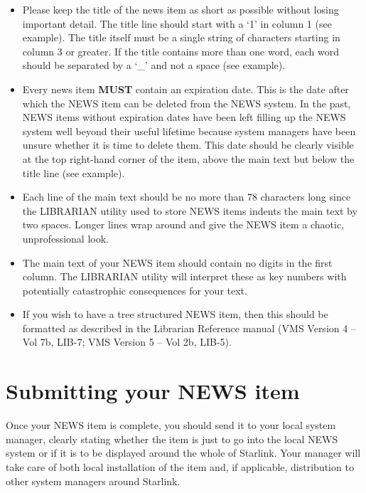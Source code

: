\begin{itemize}

\item Please keep the title of the news item as short as possible 
without losing important detail. The title line should start with a 
`1' in column 1 (see example). The title itself must be a single string of
characters starting in column 3 or greater. If the title contains
more than one word, each word should be separated by a `\_' and
not a space (see example).

\item Every news item {\bf MUST} contain an expiration date. This is the date
after which the NEWS item can be deleted from the NEWS system. In the past,
NEWS items without expiration dates have been left filling up the NEWS system
well beyond their useful lifetime because system managers have been unsure 
whether it is time to delete them. This date should be clearly visible at the
top right-hand corner of the item, above the main text but below the 
title line (see example). 

\item Each line of the main text should be no more than 78 characters long
since the LIBRARIAN utility used to store NEWS items 
indents the main text by two spaces. Longer
lines wrap around and give the NEWS item a chaotic, unprofessional look.

\item The main text of your NEWS item should contain no digits in
the first column. The LIBRARIAN utility will interpret these as key
numbers with potentially catastrophic consequences for your text.

\item If you wish to have a tree structured NEWS item, then this
should be formatted as described in the Librarian Reference manual
(VMS Version 4 -- Vol 7b, LIB-7; VMS Version 5 -- Vol 2b, LIB-5).

\end{itemize}

\section {Submitting your NEWS item}

Once your NEWS item is complete, you should send it to your local
system manager, clearly stating whether the item is just to go
into the local NEWS system or if it is to be displayed around the 
whole of Starlink. Your manager will take care of both local 
installation of the item and, if applicable, distribution to other system 
managers around Starlink. 

